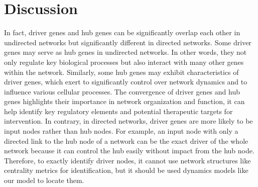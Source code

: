 \documentclass[5p,,preprint,12pt]{elsarticle}
\begin{document}
\section{Discussion} 
In fact, driver genes and hub genes can be significantly overlap each other in undirected networks but significantly different in directed networks. Some driver genes may serve as hub genes in undirected networks. In other words, they not only regulate key biological processes but also interact with many other genes within the network. Similarly, some hub genes may exhibit characteristics of driver genes, which exert to significantly control over network dynamics and to influence various cellular processes. The convergence of driver genes and hub genes highlights their importance in network organization and function, it can help identify key regulatory elements and potential therapeutic targets for intervention. In contrary, in directed networks, driver genes are more likely to be input nodes rather than hub nodes. For example, an input node with only a directed link to the hub node of a network can be the exact driver of the whole network because it can control the hub easily without impact from the hub node. Therefore, to exactly identify driver nodes, it cannot use network structures like centrality metrics for identification, but it should be used dynamics models like our model to locate them.\\
\end{document}
